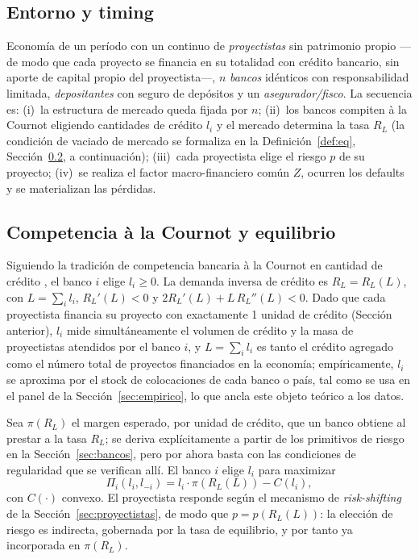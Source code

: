 \documentclass[11pt]{article}
\theoremstyle{plain}
\theoremstyle{definition}
\theoremstyle{remark}
\newcommand{\1}{\mathbf{1}}
\begin{document}
\subsection{Entorno y timing}
Economía de un período con un continuo de \textit{proyectistas} sin patrimonio propio —de modo
que cada proyecto se financia en su totalidad con crédito bancario, sin aporte de capital
propio del proyectista—, $n$ \textit{bancos} idénticos con responsabilidad limitada,
\textit{depositantes} con seguro de depósitos y un \textit{asegurador/fisco}. La secuencia es:
(i)~la estructura de mercado queda fijada por $n$; (ii)~los bancos compiten à la Cournot
eligiendo cantidades de crédito $l_i$ y el mercado determina la tasa $R_L$ (la condición de
vaciado de mercado se formaliza en la Definición~\ref{def:eq}, Sección~\ref{sec:cournot}, a
continuación); (iii)~cada proyectista elige el riesgo $p$ de su proyecto; (iv)~se realiza el
factor macro-financiero común $Z$, ocurren los defaults y se materializan las pérdidas.

\subsection{Competencia à la Cournot y equilibrio}\label{sec:cournot}
Siguiendo la tradición de competencia bancaria à la Cournot en cantidad de crédito
\citep{MMR2010,Vives2016}, el banco $i$ elige $l_i\ge 0$. La demanda inversa de crédito es
$R_L=R_L(L)$, con $L=\sum_i l_i$, $R_L'(L)<0$ y $2R_L'(L)+L\,R_L''(L)<0$. Dado que cada
proyectista financia su proyecto con exactamente 1 unidad de crédito (Sección anterior), $l_i$
mide simultáneamente el volumen de crédito y la masa de proyectistas atendidos por el banco
$i$, y $L=\sum_i l_i$ es tanto el crédito agregado como el número total de proyectos
financiados en la economía; empíricamente, $l_i$ se aproxima por el stock de colocaciones de
cada banco o país, tal como se usa en el panel de la Sección~\ref{sec:empirico}, lo que ancla
este objeto teórico a los datos.

Sea $\pi(R_L)$ el margen esperado, por unidad de crédito, que un banco obtiene al prestar a la
tasa $R_L$; se deriva explícitamente a partir de los primitivos de riesgo en la
Sección~\ref{sec:bancos}, pero por ahora basta con las condiciones de regularidad que se
verifican allí. El banco $i$ elige $l_i$ para maximizar
\begin{equation}
\Pi_i(l_i,l_{-i})=l_i\cdot\pi(R_L(L))-C(l_i),
\label{eq:profit}
\end{equation}
con $C(\cdot)$ convexo. El proyectista responde según el mecanismo de \textit{risk-shifting} de
la Sección~\ref{sec:proyectistas}, de modo que $p=p(R_L(L))$: la elección de riesgo es
indirecta, gobernada por la tasa de equilibrio, y por tanto ya incorporada en $\pi(R_L)$.
\end{document}
